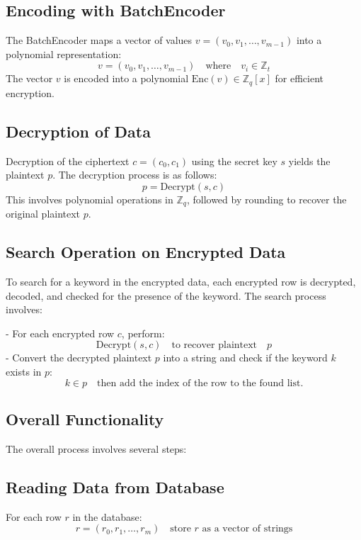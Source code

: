 \documentclass[conference]{IEEEtran}
\begin{document}
\subsection{Encoding with BatchEncoder}

The BatchEncoder maps a vector of values \( v = (v_0, v_1, \dots, v_{m-1}) \) into a polynomial representation:
\[
v = (v_0, v_1, \dots, v_{m-1}) \quad \text{where} \quad v_i \in \mathbb{Z}_t
\]
The vector \( v \) is encoded into a polynomial \( \text{Enc}(v) \in \mathbb{Z}_q[x] \) for efficient encryption.

\subsection{Decryption of Data}

Decryption of the ciphertext \( c = (c_0, c_1) \) using the secret key \( s \) yields the plaintext \( p \). The decryption process is as follows:
\[
p = \text{Decrypt}(s, c)
\]
This involves polynomial operations in \( \mathbb{Z}_q \), followed by rounding to recover the original plaintext \( p \).

\subsection{Search Operation on Encrypted Data}

To search for a keyword in the encrypted data, each encrypted row is decrypted, decoded, and checked for the presence of the keyword. The search process involves:

- For each encrypted row \( c \), perform:
\[
\text{Decrypt}(s, c) \quad \text{to recover plaintext} \quad p
\]
- Convert the decrypted plaintext \( p \) into a string and check if the keyword \( k \) exists in \( p \):
\[
k \in p \quad \text{then add the index of the row to the found list.}
\]

\subsection{Overall Functionality}

The overall process involves several steps:

\subsection{Reading Data from Database}
For each row \( r \) in the database:
\[
r = (r_0, r_1, \dots, r_m) \quad \text{store } r \text{ as a vector of strings}
\]
\end{document}
